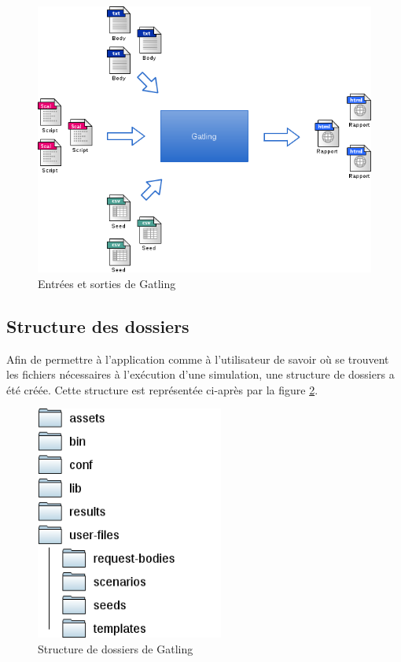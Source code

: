 \begin{figure}[h]
\begin{center}
\includegraphics[width=400pt]{img/io.png}
\end{center}
\caption{Entrées et sorties de Gatling}
\label{io}
\end{figure}

\subsection{Structure des dossiers}
Afin de permettre à l'application comme à l'utilisateur de savoir où se trouvent les fichiers nécessaires à l'exécution d'une simulation, une structure de dossiers a été créée. Cette structure est représentée ci-après par la figure \ref{folders}.

\begin{figure}[h]
\begin{center}
\includegraphics[width=175pt]{img/folders.png}
\end{center}
\caption{Structure de dossiers de Gatling}
\label{folders}
\end{figure}

